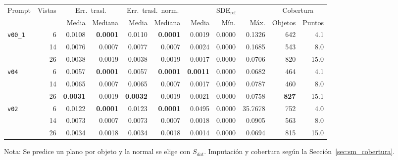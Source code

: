 \begin{table}[H]
\begin{tabular*}{\textwidth}{@{\extracolsep{\fill}}lrrrrrrrrrr@{}}
\toprule
\multirow{2}{*}{Prompt} & \multirow{2}{*}{Vistas} & \multicolumn{2}{c}{Err.\ trasl.} & \multicolumn{2}{c}{Err.\ trasl.\ norm.} & \multicolumn{3}{c}{SDE$_{\mathrm{ref}}$} & \multicolumn{2}{c}{Cobertura} \\
\cmidrule(lr){3-4} \cmidrule(lr){5-6} \cmidrule(lr){7-9} \cmidrule(lr){10-11}
 &  & Media & Mediana & Media & Mediana & Media & Mín. & Máx. & Objetos & Puntos \\
\midrule
\multirow{3}{*}{\texttt{v00\_1}} & 6 & 0.0108 & \textbf{0.0001} & 0.0110 & \textbf{0.0001} & 0.0019 & 0.0000 & 0.1326 & 642 & 4.1 \\
 & 14 & 0.0076 & 0.0007 & 0.0077 & 0.0007 & 0.0024 & 0.0000 & 0.1685 & 543 & 8.0 \\
 & 26 & 0.0038 & 0.0019 & 0.0038 & 0.0019 & 0.0017 & 0.0000 & 0.0706 & 820 & 15.0 \\
\midrule
\multirow{3}{*}{\texttt{v04}} & 6 & 0.0057 & \textbf{0.0001} & 0.0057 & \textbf{0.0001} & \textbf{0.0011} & 0.0000 & 0.0682 & 464 & 4.1 \\
 & 14 & 0.0065 & 0.0007 & 0.0065 & 0.0007 & 0.0017 & 0.0000 & 0.0787 & 460 & 8.0 \\
 & 26 & \textbf{0.0031} & 0.0019 & \textbf{0.0032} & 0.0019 & 0.0021 & 0.0000 & 0.0758 & \textbf{827} & 15.1 \\
\midrule
\multirow{3}{*}{\texttt{v02}} & 6 & 0.0122 & \textbf{0.0001} & 0.0123 & \textbf{0.0001} & 0.0495 & 0.0000 & 35.7678 & 752 & 4.0 \\
 & 14 & 0.0073 & 0.0007 & 0.0073 & 0.0007 & 0.0018 & 0.0000 & 0.0905 & 563 & 8.0 \\
 & 26 & 0.0034 & 0.0018 & 0.0034 & 0.0018 & 0.0014 & 0.0000 & 0.0694 & 815 & 15.0 \\
\bottomrule
\end{tabular*}

\vspace{1.5ex}
\begin{minipage}{\textwidth}
Nota: Se predice un plano por objeto y la normal se elige con $S_{dat}$. Imputación y cobertura según la Sección~\ref{sec:sm_cobertura}.
\end{minipage}
\end{table}

\newpage

\clearpage

